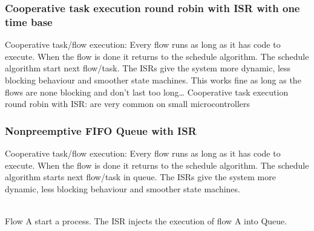\subsubsection{Cooperative task execution round robin with ISR with one time base}
Cooperative task/flow execution: Every flow runs as long as it has code to execute. When the flow is done
it returns to the schedule algorithm. The schedule algorithm start next flow/task.
The ISRs give the system more dynamic, less blocking behaviour and smoother state machines.
This works fine as long as the flows are none blocking and don’t last too long…
Cooperative task execution round robin with ISR: are very common on small microcontrollers
\begin{paracol}{2}
  
  \switchcolumn
  
  \switchcolumn
  
  \switchcolumn
  
\end{paracol}


\subsubsection{Nonpreemptive FIFO Queue with ISR}
Cooperative task/flow execution: Every flow runs as long as it has code to execute. When the flow is
done it returns to the schedule algorithm. The schedule algorithm starts next flow/task in queue.
The ISRs give the system more dynamic, less blocking behaviour and smoother state machines.
\begin{paracol}{3}
  
  \switchcolumn
  
  \switchcolumn
  
\end{paracol}
\\
Flow A start a process.
The ISR injects the execution of flow A into Queue.

